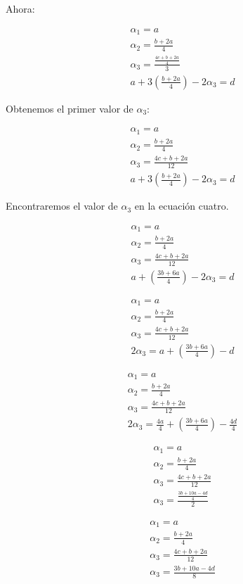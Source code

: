 \documentclass[letterpaper]{article}
\renewcommand{\*}{\cdot}
\theoremstyle{definition}
\begin{document}
Ahora:
\begin{center}
	\begin{align*}
	\alpha_{1}=a\\
	\alpha_{2}=\frac{b+2a}{4}\\
	\alpha_{3}=\frac{\frac{4c+b+2a}{4}}{3}\\
	a+3(\frac{b+2a}{4})-2\alpha_{3}=d
	\end{align*}
\end{center}
Obtenemos el primer valor de $\alpha_{3}$: 
\begin{center}
	\begin{align*}
	\alpha_{1}=a\\
	\alpha_{2}=\frac{b+2a}{4}\\
	\alpha_{3}=\frac{4c+b+2a}{12}\\
	a+3(\frac{b+2a}{4})-2\alpha_{3}=d
	\end{align*}
\end{center}
Encontraremos el valor de $\alpha_{3}$ en la ecuación cuatro.
\begin{center}
	\begin{align*}
	\alpha_{1}=a\\
	\alpha_{2}=\frac{b+2a}{4}\\
	\alpha_{3}=\frac{4c+b+2a}{12}\\
	a+(\frac{3b+6a}{4})-2\alpha_{3}=d
	\end{align*}
\end{center}
\begin{center}
	\begin{align*}
	\alpha_{1}=a\\
	\alpha_{2}=\frac{b+2a}{4}\\
	\alpha_{3}=\frac{4c+b+2a}{12}\\
	2\alpha_{3}=a+(\frac{3b+6a}{4})-d
	\end{align*}
\end{center}
\begin{center}
	\begin{align*}
	\alpha_{1}=a\\
	\alpha_{2}=\frac{b+2a}{4}\\
	\alpha_{3}=\frac{4c+b+2a}{12}\\
	2\alpha_{3}=\frac{4a}{4}+(\frac{3b+6a}{4})-\frac{4d}{4}
	\end{align*}
\end{center}
\begin{center}
	\begin{align*}
	\alpha_{1}=a\\
	\alpha_{2}=\frac{b+2a}{4}\\
	\alpha_{3}=\frac{4c+b+2a}{12}\\
	\alpha_{3}=\frac{\frac{3b+10a-4d}{4}}{2}
	\end{align*}
\end{center}
\begin{center}
	\begin{align*}
	\alpha_{1}=a\\
	\alpha_{2}=\frac{b+2a}{4}\\
	\alpha_{3}=\frac{4c+b+2a}{12}\\
	\alpha_{3}=\frac{3b+10a-4d}{8}
	\end{align*}
\end{center}
\end{document}
